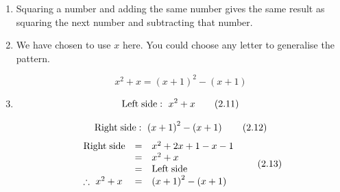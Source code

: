 {\begin{mdframed}[linewidth=4, leftmargin=40, rightmargin=40]
\begin{exercise}
\begin{enumerate}[noitemsep, label=\textbf{Step} \textbf{\arabic*}. ]
    \begin{equation}
    \begin{array}{cc}\hfill {5}^{2}+5={6}^{2}-6\\ \hfill {6}^{2}+6={7}^{2}-7\end{array}\tag{2.9}
      \end{equation}
        \item  
        \label{m39362*id66445}Squaring a number and adding the same number gives the same result as squaring the next number and subtracting that number.\par 
        \item  
        \label{m39362*id66453}We have chosen to use $x$ here. You could choose any letter to generalise the pattern.\par 
        \label{m39362*id66467}\nopagebreak\noindent{}
          
    \begin{equation}
    {x}^{2}+x={\left(x+1\right)}^{2}-\left(x+1\right)\tag{2.10}
      \end{equation}
        \item  
        \label{m39362*id66525}\nopagebreak\noindent{}
          
    \begin{equation}
    \mathrm{Left\; side}:\phantom{\rule{3.33333pt}{0ex}}{x}^{2}+x\tag{2.11}
      \end{equation}
        \label{m39362*id66572}\nopagebreak\noindent{}
          
    \begin{equation}
    \mathrm{Right\; side}:\phantom{\rule{3.33333pt}{0ex}}{\left(x+1\right)}^{2}-\left(x+1\right)\tag{2.12}
      \end{equation}
        \label{m39362*id66641}\nopagebreak\noindent{}
    \begin{equation}
    \begin{array}{ccc}\mathrm{Right\; side}\hfill & =& {x}^{2}+2x+1-x-1\hfill \\ & =& {x}^{2}+x\hfill \\ & =& \mathrm{Left\; side}\hfill \\ \therefore \phantom{\rule{3.33333pt}{0ex}}{x}^{2}+x\hfill & =& {\left(x+1\right)}^{2}-\left(x+1\right)\hfill \end{array}\tag{2.13}
      \end{equation}
        \end{enumerate}
    \end{exercise}
    \end{mdframed}
    }
    \noindent
    \label{m39362*eip-817}
